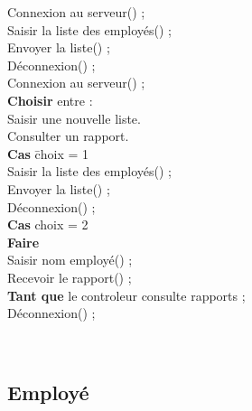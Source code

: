 \begin{tabbing}

Connexion au serveur() ;\\

Saisir la liste des employés() ;\\

Envoyer la liste() ;\\

Déconnexion() ;\\

Connexion au serveur() ;\\

\textbf{Choisir} entre :\\


Saisir une nouvelle liste.\\

Consulter un rapport.\\


\textbf{Cas} \= choix = 1\\

	\> Saisir la liste des employés() ;\\
	
	\> Envoyer la liste() ;\\
	
	\> Déconnexion() ; \\

\textbf{Cas} choix = 2 \\

    \> \textbf{Faire} \=	\\
     
	\> \> Saisir nom employé() ; \\
	
	\> \> Recevoir le rapport() ; \\
	
\> \textbf{Tant que} le controleur consulte rapports ; \\
     
Déconnexion() ;

\\

\end{tabbing}


\subsection{Employé}

